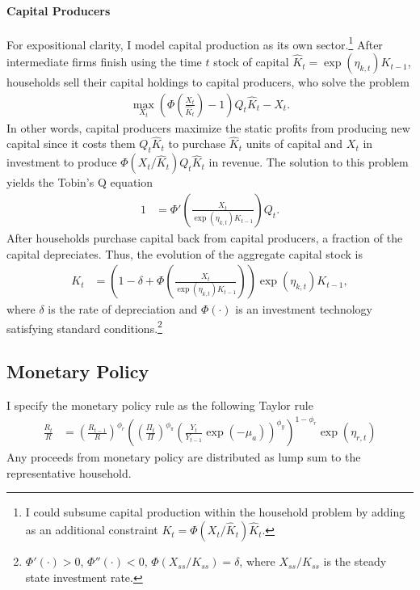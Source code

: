 \documentclass[12 pt, oneside]{article}
\theoremstyle{definition}
\theoremstyle{definition}
\theoremstyle{definition}
\begin{document}
\paragraph{Capital Producers}
For expositional clarity, I model capital production as its own sector.\footnote{I could subsume capital production within the household problem by adding as an additional constraint $K_t = \Phi(X_t/\hat{K}_t)\hat{K}_t$.}
After intermediate firms finish using the time $t$ stock of capital $\hat{K}_t = \exp(\eta_{k, t})K_{t - 1}$,  households sell their capital holdings to capital producers, who solve the problem
\begin{align}
  \max_{X_t} \left(\Phi\left(\frac{X_t}{\hat{K}_t}\right) - 1\right)Q_t\hat{K}_t - X_t.
\end{align}
In other words, capital producers maximize the static profits from producing new capital since it costs them $Q_t\hat{K}_t$ to purchase $\hat{K}_t$ units of capital and $X_t$ in investment to produce $\Phi(X_t / \hat{K}_t)Q_t \hat{K}_t$ in revenue.
The solution to this problem yields the Tobin's Q equation
\begin{align}\label{eq:tobins q}
  1 & = \Phi'\left(\frac{X_t}{\exp(\eta_{k, t})K_{t - 1}}\right) Q_t.
\end{align}
After households purchase capital back from capital producers, a fraction of the capital depreciates. Thus, the evolution of the aggregate capital stock is
\begin{align}
    \label{eq:capital accumulation equation}
  K_t & = \left(1 - \delta + \Phi\left(\frac{X_t}{\exp(\eta_{k, t})K_{t - 1}}\right)\right)\exp(\eta_{k, t})K_{t - 1},
\end{align}
where $\delta$ is the rate of depreciation and $\Phi(\cdot)$ is an investment technology satisfying standard conditions.\footnote{$\Phi'(\cdot) > 0$, $\Phi''(\cdot) < 0$, $\Phi(X_{ss}/K_{ss}) = \delta$, where $X_{ss} / K_{ss}$ is the steady state investment rate.}


\subsection{Monetary Policy}
I specify the monetary policy rule as the following Taylor rule
\begin{align}\label{eq:taylor rule}
  \frac{R_t}{R} & =  \left(\frac{R_{t - 1}}{R}\right)^{\phi_r}\left(\left(\frac{\Pi_t}{\Pi}\right)^{\phi_\pi}\left(\frac{Y_t}{Y_{t - 1}}\exp(-\mu_a)\right)^{\phi_y}\right)^{1 - \phi_r}\exp(\eta_{r, t})
\end{align}
Any proceeds from monetary policy are distributed as lump sum to the representative household.
\end{document}
